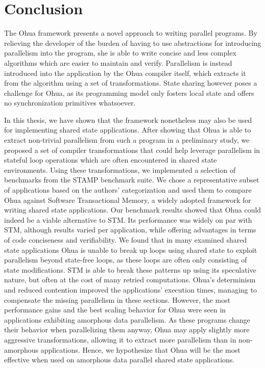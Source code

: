 %
\chapter{Conclusion}
\label{sec:conclusion}

The Ohua framework presents a novel approach to writing parallel programs.
By relieving the developer of the burden of having to use abstractions for introducing parallelism into the program, she is able to write concise and less complex algorithms which are easier to maintain and verify.
Parallelism is instead introduced into the application by the Ohua compiler itself, which extracts it from the algorithm using a set of transformations.
State sharing however poses a challenge for Ohua, as its programming model only fosters local state and offers no synchronization primitives whatsoever.

In this thesis, we have shown that the framework nonetheless may also be used for implementing shared state applications.
After showing that Ohua is able to extract non-trivial parallelism from such a program in a preliminary study, we proposed a set of compiler transformations that could help leverage parallelism in stateful loop operations which are often encountered in shared state environments.
Using these transformations, we implemented a selection of benchmarks from the STAMP benchmark suite.
We chose a representative subset of applications based on the authors' categorization and used them to compare Ohua against Software Transactional Memory, a widely adopted framework for writing shared state applications.
Our benchmark results showed that Ohua could indeed be a viable alternative to STM.
Its performance was widely on par with STM, although results varied per application, while offering advantages in terms of code conciseness and verifiability.
We found that in many examined shared state applications Ohua is unable to break up loops using shared state to exploit parallelism beyond state-free loops, as these loops are often only consisting of state modifications.
STM is able to break these patterns up using its speculative nature, but often at the cost of many retried computations.
Ohua's determinism and reduced contention improved the applications' execution times, managing to compensate the missing parallelism in these sections.
However, the most performance gains and the best scaling behavior for Ohua were seen in applications exhibiting amorphous data parallelism.
As these programs change their behavior when parallelizing them anyway, Ohua may apply slightly more aggressive transformations, allowing it to extract more parallelism than in non-amorphous applications.
Hence, we hypothesize that Ohua will be the most effective when used on amorphous data parallel shared state applications.

